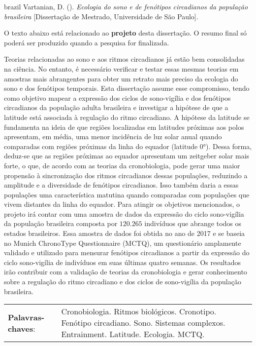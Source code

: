 
\begin{resumoenv}[\resumoestrangeironame]
\begin{otherlanguage*}{brazil}
Vartanian, D. ({\imprimirdata}). \textit{Ecologia do sono e de fenótipos circadianos da população brasileira} [Dissertação de Mestrado, Universidade de São Paulo].


O texto abaixo está relacionado ao \textbf{projeto} desta dissertação. O
resumo final só poderá ser produzido quando a pesquisa for finalizada.

Teorias relacionadas ao sono e aos ritmos circadianos já estão bem
consolidadas na ciência. No entanto, é necessário verificar e testar
essas mesmas teorias em amostras mais abrangentes para obter um retrato
mais preciso da ecologia do sono e dos fenótipos temporais. Esta
dissertação assume esse compromisso, tendo como objetivo mapear a
expressão dos ciclos de sono-vigília e dos fenótipos circadianos da
população adulta brasileira e investigar a hipótese de que a latitude
está associada à regulação do ritmo circadiano. A hipótese da latitude
se fundamenta na ideia de que regiões localizadas em latitudes próximas
aos polos apresentam, em média, uma menor incidência de luz solar anual
quando comparadas com regiões próximas da linha do equador (latitude
0°). Dessa forma, deduz-se que as regiões próximas ao equador apresentam
um zeitgeber solar mais forte, o que, de acordo com as teorias da
cronobiologia, pode gerar uma maior propensão à sincronização dos ritmos
circadianos dessas populações, reduzindo a amplitude e a diversidade de
fenótipos circadianos. Isso também daria a essas populações uma
característica matutina quando comparadas com populações que vivem
distantes da linha do equador. Para atingir os objetivos mencionados, o
projeto irá contar com uma amostra de dados da expressão do ciclo
sono-vigília da população brasileira composta por \(120.265\) indivíduos
que abrange todos os estados brasileiros. Essa amostra de dados foi
obtida no ano de 2017 e se baseia no Munich ChronoType Questionnaire
(MCTQ), um questionário amplamente validado e utilizado para mensurar
fenótipos circadianos a partir da expressão do ciclo sono-vigília de
indivíduos em suas últimas quatro semanas. Os resultados irão contribuir
com a validação de teorias da cronobiologia e gerar conhecimento sobre a
regulação do ritmo circadiano e dos ciclos de sono-vigília da população
brasileira.


\begin{tabular}{p{3.6cm} p{12.3cm}}
  \textbf{Palavras-chaves}: &  Cronobiologia. Ritmos biológicos. Cronotipo. Fenótipo circadiano. Sono. Sistemas complexos. Entrainment. Latitude. Ecologia. MCTQ.
\end{tabular}
\end{otherlanguage*}
\end{resumoenv}
